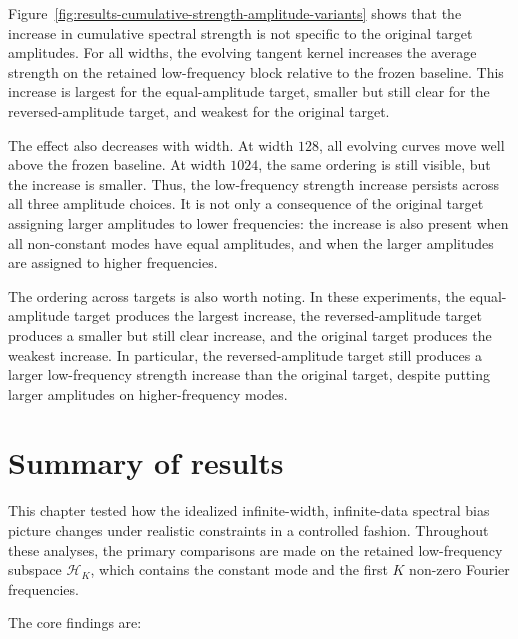 Figure~\ref{fig:results-cumulative-strength-amplitude-variants} shows that the
increase in cumulative spectral strength is not specific to the original target
amplitudes. For all widths, the evolving tangent kernel increases the average
strength on the retained low-frequency block relative to the frozen baseline.
This increase is largest for the equal-amplitude target, smaller but still clear
for the reversed-amplitude target, and weakest for the original target.

The effect also decreases with width. At width \(128\), all evolving curves move
well above the frozen baseline. At width \(1024\), the same ordering is still
visible, but the increase is smaller. Thus, the low-frequency strength increase
persists across all three amplitude choices. It is not only a consequence of
the original target assigning larger amplitudes to lower frequencies: the
increase is also present when all non-constant modes have equal amplitudes, and
when the larger amplitudes are assigned to higher frequencies.

The ordering across targets is also worth noting. In these experiments, the
equal-amplitude target produces the largest increase, the reversed-amplitude
target produces a smaller but still clear increase, and the original target
produces the weakest increase. In particular, the reversed-amplitude target
still produces a larger low-frequency strength increase than the original
target, despite putting larger amplitudes on higher-frequency modes.

\section{Summary of results}
\label{sec:results-summary}

This chapter tested how the idealized infinite-width, infinite-data spectral
bias picture changes under realistic constraints in a controlled fashion.
Throughout these analyses, the primary comparisons are made on the retained
low-frequency subspace $\mathcal{H}_K$, which contains the constant mode and
the first $K$ non-zero Fourier frequencies.

The core findings are:

